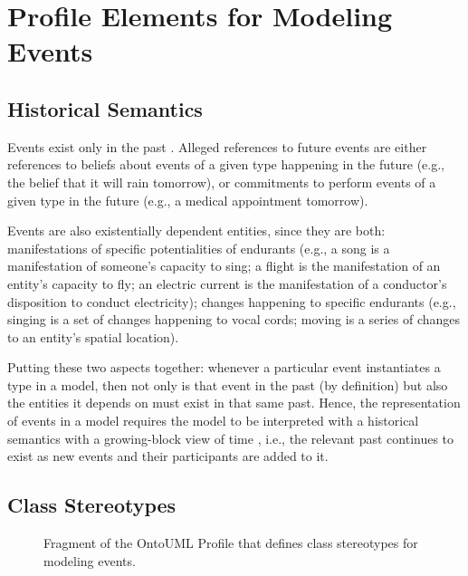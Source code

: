 \chapter{Profile Elements for Modeling Events}

\section{Historical Semantics}


Events exist only in the past \cite{guizzardi2016ontological,events_as_entities_in_ontology_driven_conceptual_modeling_2019}. Alleged references to future events are either references to beliefs about events of a given type happening in the future (e.g., the belief that it will rain tomorrow), or commitments to perform events of a given type in the future (e.g., a medical appointment tomorrow).

Events are also existentially dependent entities, since they are both: manifestations of specific potentialities of endurants (e.g., a song is a manifestation of someone's capacity to sing; a flight is the manifestation of an entity's capacity to fly; an electric current is the manifestation of a conductor's disposition to conduct electricity); changes happening to specific endurants (e.g., singing is a set of changes happening to vocal cords; moving is a series of changes to an entity's spatial location). 

Putting these two aspects together: whenever a particular event instantiates a type in a model, then not only is that event in the past (by definition) but also the entities it depends on must exist in that same past. Hence, the representation of events in a model requires the model to be interpreted with a historical semantics with a growing-block view of time \cite{guizzardi2016ontological,diekemper2014existence}, i.e., the relevant past continues to exist as new events and their participants are added to it. 

\section{Class Stereotypes}

\begin{figure}[h]
    \centering
    
    \caption{Fragment of the OntoUML Profile that defines class stereotypes for modeling events.}
    \label{fig:event-classes-profile}
\end{figure}

